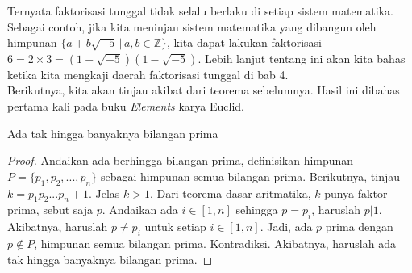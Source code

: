 	Ternyata faktorisasi tunggal tidak selalu berlaku di setiap sistem matematika. Sebagai contoh, jika kita meninjau sistem matematika yang dibangun oleh himpunan $\{ a+b\sqrt{-5} \, | \, a,b \in \mathbb{Z} \}$, kita dapat lakukan faktorisasi $6 = 2 \times 3 = (1+\sqrt{-5})(1-\sqrt{-5})$. Lebih lanjut tentang ini akan kita bahas ketika kita mengkaji daerah faktorisasi tunggal di bab 4.\\
	
	Berikutnya, kita akan tinjau akibat dari teorema sebelumnya. Hasil ini dibahas pertama kali pada buku \textit{Elements} karya Euclid.
	\begin{theorem}
		Ada tak hingga banyaknya bilangan prima
	\end{theorem}
	\begin{proof}
		Andaikan ada berhingga bilangan prima, definisikan himpunan $P = \{ p_1, p_2, ..., p_n \}$ sebagai himpunan semua bilangan prima. Berikutnya, tinjau $k = p_1 p_2 ... p_n + 1$. Jelas $k > 1$. Dari teorema dasar aritmatika, $k$ punya faktor prima, sebut saja $p$. Andaikan ada $i \in [1,n]$ sehingga $p = p_i$, haruslah $p|1$. Akibatnya, haruslah $p \ne p_i$ untuk setiap $i \in [1,n]$. Jadi, ada $p$ prima dengan $p \not\in P$, himpunan semua bilangan prima. Kontradiksi. Akibatnya, haruslah ada tak hingga banyaknya bilangan prima.
	\end{proof}
	